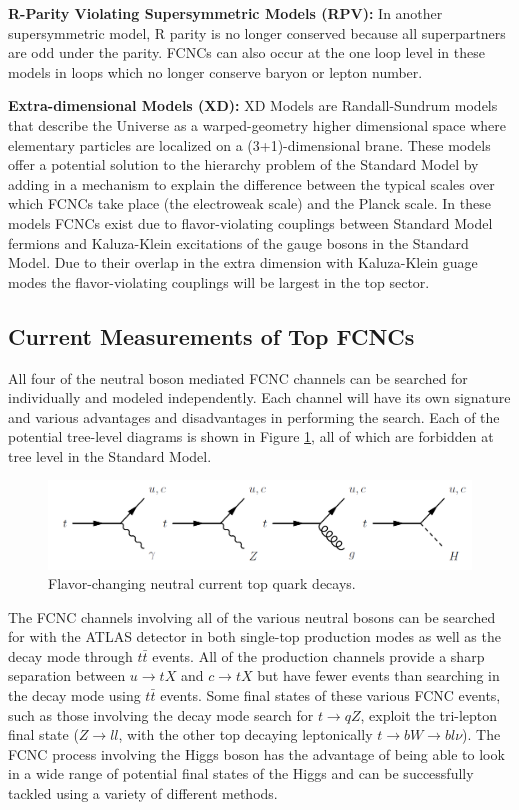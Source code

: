 \textbf{R-Parity Violating Supersymmetric Models (RPV): }  In another supersymmetric model, R parity is no longer conserved because all superpartners are odd under the parity.  FCNCs can also occur at the one loop level in these models in loops which no longer conserve baryon or lepton number\cite{RPVSusyFCNC}.

\textbf{Extra-dimensional Models (XD): }  XD Models are Randall-Sundrum models that describe the Universe as a warped-geometry higher dimensional space where elementary particles are localized on a (3+1)-dimensional brane.  These models offer a potential solution to the hierarchy problem of the Standard Model by adding in a mechanism to explain the difference between the typical scales over which FCNCs take place (the electroweak scale) and the Planck scale.  In these models FCNCs exist due to flavor-violating couplings between Standard Model fermions and Kaluza-Klein excitations of the gauge bosons in the Standard Model\cite{XDFCNC}.  Due to their overlap in the extra dimension with Kaluza-Klein guage modes the flavor-violating couplings will be largest in the top sector.


\subsection{Current Measurements of Top FCNCs}

All four of the neutral boson mediated FCNC channels can be searched for individually and modeled independently.  Each channel will have its own signature and various advantages and disadvantages in performing the search.  Each of the potential tree-level diagrams is shown in Figure \ref{fig:AllFCNCs}, all of which are forbidden at tree level in the Standard Model.  %
\begin{figure}[h!]
	\centering
	\includegraphics[width=\columnwidth]{../ThesisImages/Theory/AllFCNCDiagrams.png}
	\caption{Flavor-changing neutral current top quark decays.}
	\label{fig:AllFCNCs}
\end{figure}

The FCNC channels involving all of the various neutral bosons can be searched for with the ATLAS detector in both single-top production modes as well as the decay mode through $t\bar{t}$ events.  All of the production channels provide a sharp separation between $u\rightarrow tX$ and $c\rightarrow tX$ but have fewer events than searching in the decay mode using $t\bar{t}$ events.  Some final states of these various FCNC events, such as those involving the decay mode search for $t\rightarrow q Z$, exploit the tri-lepton final state ($Z\rightarrow ll$, with the other top decaying leptonically $t\rightarrow bW\rightarrow bl\nu$).  The FCNC process involving the Higgs boson has the advantage of being able to look in a wide range of potential final states of the Higgs and can be successfully tackled using a variety of different methods.

